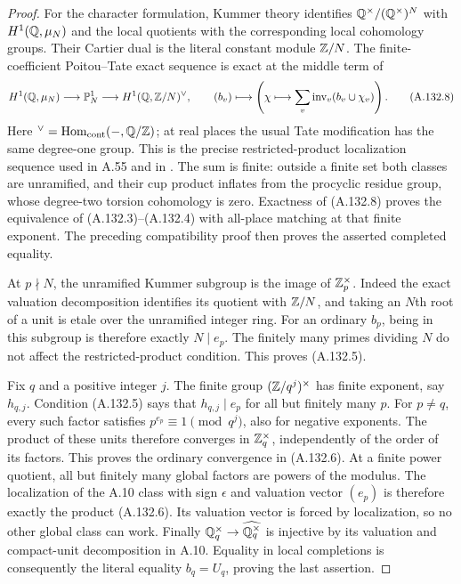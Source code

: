 \begin{proof}
For the character formulation, Kummer theory identifies
\(\mathbb Q^\times/(\mathbb Q^\times)^N\) with \(H^1(\mathbb Q,\mu_N)\)
and the local quotients with the corresponding local
cohomology groups.  Their Cartier dual is the literal
constant module \(\mathbb Z/N\).
The finite-coefficient Poitou--Tate exact sequence is
exact at the middle term of
\[
 H^1(\mathbb Q,\mu_N)\longrightarrow {\mathbb P}^1_N
       \longrightarrow H^1(\mathbb Q,\mathbb Z/N)^\vee,\qquad
 (b_v)\longmapsto
       \left(\chi\longmapsto
                   \sum_v\operatorname{inv}_v(b_v\cup\chi_v)\right).
\tag{A.132.8}
\]
Here \({}^\vee=\operatorname{Hom}_{\rm cont}(-,\mathbb Q/\mathbb Z)\);
at real places the usual Tate modification has the
same degree-one group.  This is the precise
restricted-product localization sequence used in
A.55 and in
\cite[I, Theorem 4.10(b) and Corollary 4.15]{BIR_MilneADT}.
The sum is finite: outside a finite set both classes
are unramified, and their cup product inflates from
the procyclic residue group, whose degree-two torsion
cohomology is zero.
Exactness of (A.132.8) proves the equivalence of
(A.132.3)--(A.132.4) with all-place matching at that
finite exponent.  The preceding compatibility proof
then proves the asserted completed equality.

At \(p\nmid N\), the unramified Kummer subgroup is
the image of \(\mathbb Z_p^\times\).
Indeed the exact valuation decomposition identifies
its quotient with \(\mathbb Z/N\), and taking an \(N\)th root
of a unit is etale over the unramified integer ring.
For an ordinary \(b_p\), being in this subgroup is
therefore exactly \(N\mid e_p\).
The finitely many primes dividing \(N\) do not affect
the restricted-product condition.  This proves
(A.132.5).

Fix \(q\) and a positive integer \(j\).
The finite group \((\mathbb Z/q^j)^\times\) has finite exponent,
say \(h_{q,j}\).
Condition (A.132.5) says that \(h_{q,j}\mid e_p\)
for all but finitely many \(p\).
For \(p\ne q\), every such factor satisfies
\(p^{e_p}\equiv1\pmod{q^j}\), also for negative exponents.
The product of these units therefore converges in
\(\mathbb Z_q^\times\), independently of the order of its
factors.  This proves the ordinary convergence in
(A.132.6).
At a finite power quotient, all but finitely many
global factors are powers of the modulus.
The localization of the A.10 class with sign
\(\epsilon\) and valuation vector \((e_p)\) is
therefore exactly the product (A.132.6).
Its valuation vector is forced by localization,
so no other global class can work.
Finally \(\mathbb Q_q^\times\to\widehat{\mathbb Q_q^\times}\)
is injective by its valuation and compact-unit
decomposition in A.10.
Equality in local completions is consequently the
literal equality \(b_q=U_q\), proving the last assertion.
\end{proof}

